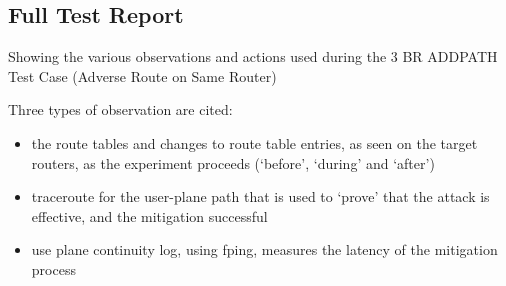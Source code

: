 










\subsection{Full Test Report}

Showing the various observations and actions used during the 3 BR ADDPATH Test Case (Adverse Route on Same Router)

Three types of observation are cited:
\begin{itemize}
    \item the route tables and changes to route table entries, as seen on the target routers, as the experiment proceeds (`before', `during' and `after')
    \item traceroute for the user-plane path that is used to `prove' that the attack is effective, and the mitigation successful
    \item use plane continuity log, using fping, measures the latency of the mitigation process
\end{itemize}

